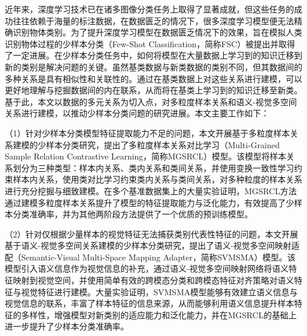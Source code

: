 \begin{cabstract}	%
近年来，深度学习技术已在诸多图像分类任务上取得了显著成就，但这些任务的成功往往依赖于海量的标注数据，在数据匮乏的情况下，很多深度学习模型便无法精确识别物体类别。为了提升深度学习模型在数据匮乏情况下的效果，旨在模拟人类识别物体过程的少样本分类（Few-Shot Classification，简称FSC）被提出并取得了一定进展。在少样本分类任务中，如何将模型在大量数据上学习到的知识迁移到新的类别是解决问题的关键。虽然基类数据与新类数据的类别不同，但其数据间的多种关系是具有相似性和关联性的。通过在基类数据上对这些关系进行建模，可以更好地理解与挖掘数据间的内在联系，从而将在基类上学习到的知识迁移至新类。基于此，本文以数据的多元关系为切入点，对多粒度样本关系和语义-视觉多空间关系进行建模，以推动少样本分类问题的研究进展。本文主要工作如下：

（1）针对少样本分类模型特征提取能力不足的问题，本文开展基于多粒度样本关系建模的少样本分类研究，提出了多粒度样本关系对比学习（Multi-Grained Sample Relation Contrastive Learning，简称MGSRCL）模型。该模型将样本关系划分为三种类型：样本内关系、类内关系和类间关系，并使用变换一致性学习约束样本内关系，使用类对比学习约束类内关系与类间关系，对多种粒度的样本关系进行充分挖掘与细致建模。在多个基准数据集上的大量实验证明，MGSRCL方法通过建模多粒度样本关系提升了模型的特征提取能力与泛化能力，有效提高了少样本分类准确率，并为其他两阶段方法提供了一个优质的预训练模型。

（2）针对仅根据少量样本的视觉特征无法捕获类别代表性特征的问题，本文开展基于语义-视觉多空间关系建模的少样本分类研究，提出了语义-视觉多空间映射适配（Semantic-Visual Multi-Space Mapping Adapter，简称SVMSMA）模型。该模型引入语义信息作为视觉信息的补充，通过语义-视觉多空间映射网络将语义特征映射到视觉空间，并使用简单有效的跨模态分类和跨模态特征对齐策略对语义特征与视觉特征进行建模。大量实验证明，SVMSMA模型能够有效建立语义信息与视觉信息的联系，丰富了样本特征的信息来源，从而能够利用语义信息提升样本特征的多样性，增强模型对新类别的适应能力和泛化能力，并在MGSRCL的基础上进一步提升了少样本分类准确率。

\end{cabstract}

